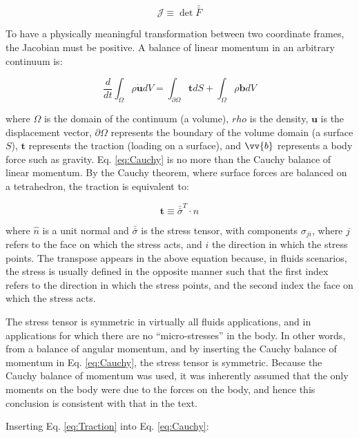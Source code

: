 \documentclass[10pt]{article}
\begin{document}
\begin{equation}
\label{eq:Jacobian}
\mathscr{J}\equiv \det{\bar{\bar{F}}}
\end{equation}

To have a physically meaningful transformation between two coordinate frames, the Jacobian must be positive. A balance of linear momentum in an arbitrary continuum is:

\begin{equation}
\label{eq:Cauchy}
\frac{d}{dt}\int_{\Omega}\rho\dot{\textbf{u}}dV=\int_{\partial\Omega}\textbf{t}dS+\int_{\Omega}\rho\textbf{b}dV
\end{equation}

where \(\Omega\) is the domain of the continuum (a volume), \(rho\) is the density, \(\textbf{u}\) is the displacement vector, \(\partial\Omega\) represents the boundary of the volume domain (a surface \(S\)), \(\textbf{t}\) represents the traction (loading on a surface), and \(\vv{b}\) represents a body force such as gravity. Eq. \eqref{eq:Cauchy} is no more than the Cauchy balance of linear momentum. By the Cauchy theorem, where surface forces are balanced on a tetrahedron, the traction is equivalent to:

\begin{equation}
\label{eq:Traction}
\textbf{t}\equiv\bar{\bar{\sigma}}^T\cdot\hat{n}
\end{equation}

where \(\hat{n}\) is a unit normal and \(\bar{\bar{\sigma}}\) is the stress tensor, with components \(\sigma_{ji}\), where \(j\) refers to the face on which the stress acts, and \(i\) the direction in which the stress points. The transpose appears in the above equation because, in fluids scenarios, the stress is usually defined in the opposite manner such that the first index refers to the direction in which the stress points, and the second index the face on which the stress acts.

The stress tensor is symmetric in virtually all fluids applications, and in applications for which there are no ``micro-stresses'' in the body. In other words, from a balance of angular momentum, and by inserting the Cauchy balance of momentum in Eq. \eqref{eq:Cauchy}, the stress tensor is symmetric. Because the Cauchy balance of momentum was used, it was inherently assumed that the only moments on the body were due to the forces on the body, and hence this conclusion is consistent with that in the text.

Inserting Eq. \eqref{eq:Traction} into Eq. \eqref{eq:Cauchy}:
\end{document}
